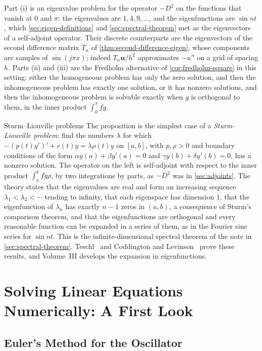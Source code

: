 Part (i) is an eigenvalue problem for the operator $-D^2$ on the functions that vanish at $0$ and $\pi$: the eigenvalues are $1,4,9,\ldots$, and the eigenfunctions are $\sin nt$, which \cref{sec:eigen-definitions} and \cref{sec:spectral-theorem} met as the eigenvectors of a self-adjoint operator. Their discrete counterparts are the eigenvectors of the second difference matrix $T_n$ of \cref{thm:second-difference-eigen}, whose components are samples of $\sin(j\pi x)$; indeed $T_n\mathbf u/h^2$ approximates $-u''$ on a grid of spacing $h$. Parts (ii) and (iii) are the Fredholm alternative of \cref{cor:fredholm-square} in this setting: either the homogeneous problem has only the zero solution, and then the inhomogeneous problem has exactly one solution, or it has nonzero solutions, and then the inhomogeneous problem is solvable exactly when $g$ is orthogonal to them, in the inner product $\int_0^\pi fg$.

\begin{note}{Sturm--Liouville problems}
The proposition is the simplest case of a \emph{Sturm--Liouville problem}: find the numbers $\lambda$ for which $-(p(t)y')'+r(t)y=\lambda\rho(t)y$ on $[a,b]$, with $p,\rho>0$ and boundary conditions of the form $\alpha y(a)+\beta y'(a)=0$ and $\gamma y(b)+\delta y'(b)=0$, has a nonzero solution. The operator on the left is self-adjoint with respect to the inner product $\int_a^bfg\rho$, by two integrations by parts, as $-D^2$ was in \cref{sec:adjoints}. The theory states that the eigenvalues are real and form an increasing sequence $\lambda_1<\lambda_2<\cdots$ tending to infinity, that each eigenspace has dimension $1$, that the eigenfunction of $\lambda_n$ has exactly $n-1$ zeros in $(a,b)$, a consequence of Sturm's comparison theorem, and that the eigenfunctions are orthogonal and every reasonable function can be expanded in a series of them, as in the Fourier sine series for $\sin nt$. This is the infinite-dimensional spectral theorem of the note in \cref{sec:spectral-theorem}. Teschl~\cite[Chap.~5]{teschl2012} and Coddington and Levinson~\cite[Chaps.~7 and~8]{coddington1955} prove these results, and Volume~III develops the expansion in eigenfunctions.
\end{note}

\section{Solving Linear Equations Numerically: A First Look}
\label{sec:higher-numerics}

\subsection{Euler's Method for the Oscillator}

